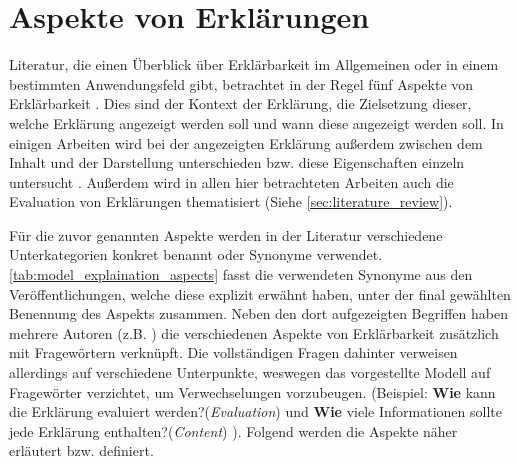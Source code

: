 \section{Aspekte von Erklärungen}
\label{sec:model_explanation_aspects}

Literatur, die einen Überblick über Erklärbarkeit im Allgemeinen oder in einem bestimmten Anwendungsfeld gibt, betrachtet in der Regel fünf Aspekte von Erklärbarkeit \cite{rosenfeld_explainability_2019, nunes_systematic_2017,chazette_knowledge_nodate}. Dies sind der Kontext der Erklärung, die Zielsetzung dieser, welche Erklärung angezeigt werden soll und wann diese angezeigt werden soll. In einigen Arbeiten wird bei der angezeigten Erklärung außerdem zwischen dem Inhalt und der Darstellung unterschieden bzw. diese Eigenschaften einzeln untersucht \cite{nunes_systematic_2017,abdulrahman_belief-based_2019}. Außerdem wird in allen hier betrachteten Arbeiten auch die Evaluation von Erklärungen thematisiert (Siehe \autoref{sec:literature_review}).

Für die zuvor genannten Aspekte werden in der Literatur verschiedene Unterkategorien konkret benannt oder Synonyme verwendet. \autoref{tab:model_explaination_aspects} fasst die verwendeten Synonyme aus den Veröffentlichungen, welche diese explizit erwähnt haben, unter der final gewählten Benennung des Aspekts zusammen. Neben den dort aufgezeigten Begriffen haben mehrere Autoren (z.B. \cite{rosenfeld_explainability_2019, chazette2020explainability}) die verschiedenen Aspekte von Erklärbarkeit zusätzlich mit Fragewörtern verknüpft. Die vollständigen Fragen dahinter verweisen allerdings auf verschiedene Unterpunkte, weswegen das vorgestellte Modell auf Fragewörter verzichtet, um Verwechselungen vorzubeugen. (Beispiel: \glqq \textbf{Wie} kann die Erklärung evaluiert werden?\grqq (\textit{Evaluation})\cite[vgl.][]{rosenfeld_explainability_2019} und \glqq \textbf{Wie} viele Informationen sollte jede Erklärung enthalten?\grqq (\textit{Content}) \cite[vgl.][]{kouki_user_2017}). Folgend werden die Aspekte näher erläutert bzw. definiert.

